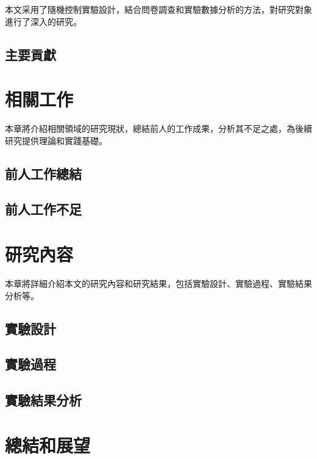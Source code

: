 \documentclass[
    writingLanguage=chinese,
    addPageTitle=yes,
    AddDeclaration=yes,
    addMUSTlog=no,
    refUnindent=yes,
    printing=no,
]{.def/must}
\begin{document}
本文采用了隨機控制實驗設計，結合問卷調查和實驗數據分析的方法，對研究對象進行了深入的研究。

\subsection{主要貢獻}

\txtHere[3]

\section{相關工作}

本章將介紹相關領域的研究現狀，總結前人的工作成果，分析其不足之處，為後續研究提供理論和實踐基礎。

\subsection{前人工作總結}

\txtHere[4]

\subsection{前人工作不足}

\txtHere[5]

\section{研究內容}

本章將詳細介紹本文的研究內容和研究結果，包括實驗設計、實驗過程、實驗結果分析等。

\subsection{實驗設計}

\txtHere[6]

\subsection{實驗過程}

\txtHere[7]

\subsection{實驗結果分析}

\txtHere[8]

\section{總結和展望}
\end{document}
